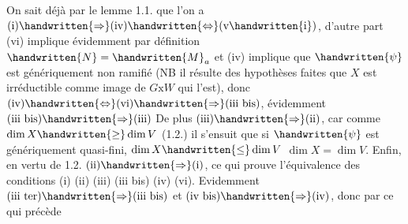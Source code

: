 On sait déjà par le lemme 1.1. que l'on a $\text{(i)}\handwritten{\Rightarrow}\text{(iv)}\handwritten{\Leftrightarrow}\text{(v\handwritten{i})}$, d'autre part (vi) implique évidemment par définition $\handwritten{N}=\handwritten{M}_a$ et (iv) implique  que $\handwritten{\psi}$ est génériquement non ramifié (NB il résulte des hypothèses faites que $X$ est irréductible comme image de $G\mathrm{x}W$ qui l'est), donc $\text{(iv)}\handwritten{\Leftrightarrow}\text{(vi)}\handwritten{\Rightarrow}\text{(iii bis)}$, évidemment $\text{(iii bis)}\handwritten{\Rightarrow}\text{(iii)}$\unsure{,}  De plus $\text{(iii)}\handwritten{\Rightarrow}\text{(ii)}$, car comme $\dim X\handwritten{\geq}\dim V$ (1.2.) il s'ensuit que si $\handwritten{\psi}$ est génériquement quasi-fini,  $\dim X\handwritten{\leq}\dim V$\handwritten{,}  $\dim X=\dim V$. Enfin, en vertu de 1.2.\handwritten{,} $\text{(ii)}\handwritten{\Rightarrow}\text{(i)}$, ce qui prouve l'équivalence des conditions (i) (ii) (iii) (iii bis) (iv) (vi). Evidemment $\text{(iii ter)}\handwritten{\Rightarrow}\text{(iii bis)}$ et $\text{(iv bis)}\handwritten{\Rightarrow}\text{(iv)}$, donc par ce qui précède

